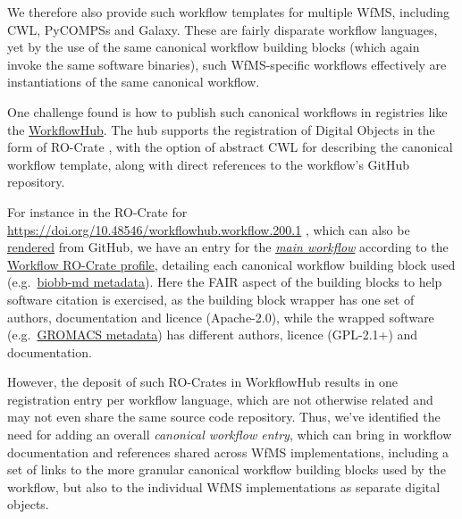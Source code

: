 We therefore also provide such workflow templates for multiple WfMS,
including CWL, PyCOMPSs and Galaxy. These are fairly disparate workflow
languages, yet by the use of the same canonical workflow building blocks
(which again invoke the same software binaries), such WfMS-specific
workflows effectively are instantiations of the same canonical workflow.

One challenge found is how to publish such canonical workflows in
registries like the \href{https://workflowhub.eu/}{WorkflowHub}. The hub
supports the registration of Digital Objects in the form of RO-Crate
\cite{Soiland-Reyes 2022}, with the option of abstract CWL for describing the canonical
workflow template, along with direct references to the workflow's GitHub
repository.

For instance in the RO-Crate for
\url{https://doi.org/10.48546/workflowhub.workflow.200.1} \cite{ch6-26},
which can also be
\href{https://rawcdn.githack.com/bioexcel/biobb_hpc_workflows/53958e7c278e53c277a7217057b785482f193f7f/ro-crate-preview.html}{rendered}
from GitHub, we have an entry for the
\emph{\href{https://rawcdn.githack.com/bioexcel/biobb_hpc_workflows/53958e7c278e53c277a7217057b785482f193f7f/ro-crate-preview.html\#workflows/MD/md_list.py}{main
workflow}} according to the
\href{https://w3id.org/workflowhub/workflow-ro-crate/1.0}{Workflow
RO-Crate profile}, detailing each canonical workflow building block used
(e.g.~\href{https://rawcdn.githack.com/bioexcel/biobb_hpc_workflows/53958e7c278e53c277a7217057b785482f193f7f/ro-crate-preview.html\#https\%3A//pypi.org/project/biobb-md/3.6.0/}{biobb-md
metadata}). Here the FAIR aspect of the building blocks to help software
citation is exercised, as the building block wrapper has one set of
authors, documentation and licence (Apache-2.0), while the wrapped
software
(e.g.~\href{https://rawcdn.githack.com/bioexcel/biobb_hpc_workflows/53958e7c278e53c277a7217057b785482f193f7f/ro-crate-preview.html\#https\%3A//doi.org/10.5281/zenodo.2564764}{GROMACS
metadata}) has different authors, licence (GPL-2.1+) and documentation.

However, the deposit of such RO-Crates in WorkflowHub results in one
registration entry per workflow language, which are not otherwise
related and may not even share the same source code repository. Thus,
we've identified the need for adding an overall \emph{canonical workflow
entry}, which can bring in workflow documentation and references shared
across WfMS implementations, including a set of links to the more
granular canonical workflow building blocks used by the workflow, but
also to the individual WfMS implementations as separate digital objects.

